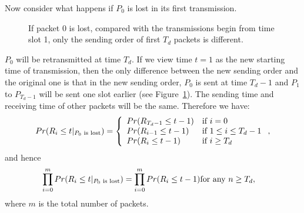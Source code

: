     Now consider what happens if $P_0$ is lost in its first transmission. 
\begin{figure}[htbp]
\centering
{}
\caption{If packet $0$ is lost, compared with the transmissions begin from time slot 1, only the sending order of first $T_d$ packets is different.}\label{f:model:comp}
\end{figure}
    $P_0$ will be retransmitted at time $T_d$. If we view time $t=1$ as
    the new starting time of transmission, then the only difference between the new
    sending order and the original one is that in the new sending order, $P_0$ is
    sent at time $T_d-1$ and $P_1$ to $P_{T_d-1}$ will be 
    sent one slot earlier (see Figure~\ref{f:model:comp}). The sending time 
    and receiving time of other packets will be the same. 
    Therefore we have:
    \begin{eqnarray}
    \label{e:model:p0notreceived}
        Pr(R_i \le t|_{\textrm{$P_0$ is lost}})= \left\{\begin{array}{ll}
        Pr(R_{T_d-1} \le t-1)             & \textrm{if $i = 0$}\\
        Pr(R_{i-1}   \le t-1)             & \textrm{if $1 \le i \le T_d - 1$}\\
        Pr(R_i       \le t-1)             & \textrm{if $i \ge T_d$} \\
        \end{array}\right.,
    \end{eqnarray} 
    and hence
    \begin{eqnarray}
    \label{e:model:equal}
       \prod_{i=0}^{m}Pr(R_i \le t|_{\textrm{$P_0$ is lost}}) = \prod_{i=0}^{m}Pr(R_i \le t-1) & \textrm{for any $n \ge T_d$},
    \end{eqnarray}
    where $m$ is the total number of packets.

